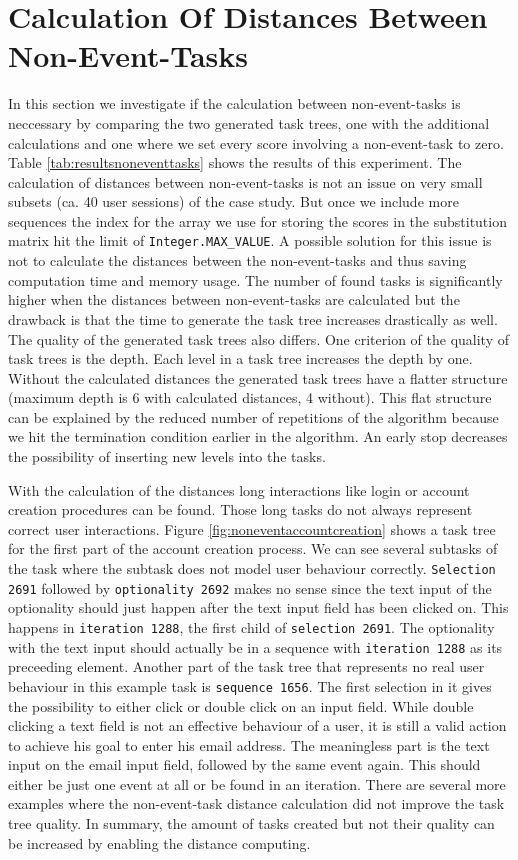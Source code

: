 \section{Calculation Of Distances Between Non-Event-Tasks}
\label{sec:noneventtasks}
In this section we investigate if the calculation between non-event-tasks is neccessary by comparing the two generated task trees, one with the additional calculations and one where
we set every score involving a non-event-task to zero. 
Table \ref{tab:resultsnoneventtasks} shows the results of this experiment.
The calculation of distances between non-event-tasks is not an issue on very small subsets (ca. 40 user sessions) of the case study. 
But once we include more sequences the index for the array we use for storing the scores in the substitution matrix hit the limit of \texttt{Integer.MAX\_VALUE}.
A possible solution for this issue is not to calculate the distances between the non-event-tasks and thus saving computation time and memory usage.
The number of found tasks is significantly higher when the distances between non-event-tasks are calculated but the drawback is that the time to generate the task tree increases drastically as well.
The quality of the generated task trees also differs.
One criterion of the quality of task trees is the depth. 
Each level in a task tree increases the depth by one.
Without the calculated distances the generated task trees have a flatter structure (maximum depth is 6 with calculated distances, 4 without).
This flat structure can be explained by the reduced number of repetitions of the algorithm because we hit the termination condition earlier in the algorithm.
An early stop decreases the possibility of inserting new levels into the tasks.

With the calculation of the distances long interactions like login or account creation procedures can be found.
Those long tasks do not always represent correct user interactions.
Figure \ref{fig:noneventaccountcreation} shows a task tree for the first part of the account creation process.
We can see several subtasks of the task where the subtask does not model user behaviour correctly.
\texttt{Selection 2691} followed by \texttt{optionality 2692} makes no sense since the text input of the optionality should just happen after the text input field has been clicked on.
This happens in \texttt{iteration 1288}, the first child of \texttt{selection 2691}. 
The optionality with the text input should actually be in a sequence with \texttt{iteration 1288} as its preceeding element.
Another part of the task tree that represents no real user behaviour in this example task is \texttt{sequence 1656}.
The first selection in it gives the possibility to either click or double click on an input field.
While double clicking a text field is not an effective behaviour of a user, it is still a valid action to achieve his goal to enter his email address.
The meaningless part is the text input on the email input field, followed by the same event again. This should either be just one event at all or be found in an iteration.
There are several more examples where the non-event-task distance calculation did not improve the task tree quality.
In summary, the amount of tasks created but not their quality can be increased by enabling the distance computing.

